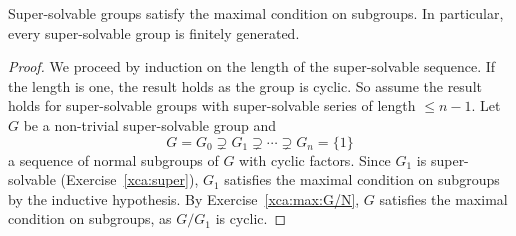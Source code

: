 %
%
%
%
%
%
%
%	

\begin{proposition}
\label{pro:superfg}
Super-solvable groups satisfy the maximal condition on subgroups. In particular, 
every super-solvable group is finitely generated. 
\end{proposition}

\begin{proof}
We proceed by induction on the length of the super-solvable sequence. If the length
is one, the result holds as the group is cyclic. 
So assume the result holds for super-solvable groups with 
super-solvable series of length $\leq n-1$.  Let $G$
be a non-trivial super-solvable group and 
	\[
	G=G_0\supsetneq
	G_1\supsetneq\cdots\supsetneq G_n=\{1\}
	\]
a sequence of normal subgroups of $G$ with cyclic factors. Since 
$G_{1}$ is super-solvable (Exercise~\ref{xca:super}),
	$G_{1}$ satisfies the maximal condition on subgroups by the inductive
 hypothesis. By Exercise~\ref{xca:max:G/N}, $G$ satisfies the maximal
 condition on subgroups, as 
 $G/G_{1}$ is cyclic. 
\end{proof}

